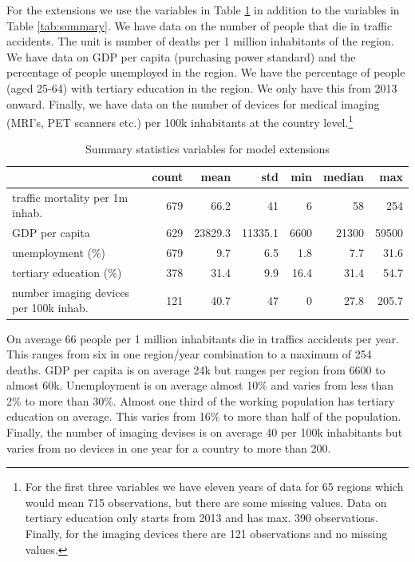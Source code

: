 \documentclass[a4paper,12pt]{article}
\begin{document}
For the extensions we use the variables in Table \ref{tab:summaryExtensions} in addition to the variables in Table \ref{tab:summary}. We have data on the number of people that die in traffic accidents. The unit is number of deaths per 1 million inhabitants of the region. We have data on GDP per capita (purchasing power standard) and the percentage of people unemployed in the region. We have the percentage of people (aged 25-64) with tertiary education in the region. We only have this from 2013 onward. Finally, we have data on the number of devices for medical imaging (MRI's, PET scanners etc.) per 100k inhabitants at the country level.\footnote{For the first three variables we have eleven years of data for 65 regions which would mean 715 observations, but there are some missing values. Data on tertiary education only starts from 2013 and has max. 390 observations. Finally, for the imaging devices there are 121 observations and no missing values.}


\begin{table}[htbp]
\caption{\label{tab:summaryExtensions}Summary statistics variables for model extensions}
\centering
\begin{tabular}{lrrrrrr}
 & count & mean & std & min & median & max\\
\hline
traffic mortality per 1m inhab. & 679 & 66.2 & 41 & 6 & 58 & 254\\
GDP per capita & 629 & 23829.3 & 11335.1 & 6600 & 21300 & 59500\\
unemployment (\%) & 679 & 9.7 & 6.5 & 1.8 & 7.7 & 31.6\\
tertiary education (\%) & 378 & 31.4 & 9.9 & 16.4 & 31.4 & 54.7\\
number imaging devices per 100k inhab. & 121 & 40.7 & 47 & 0 & 27.8 & 205.7\\
\end{tabular}
\end{table}

On average 66 people per 1 million inhabitants die in traffics accidents per year. This ranges from six in one region/year combination to a maximum of 254 deaths. GDP per capita is on average 24k but ranges per region from 6600 to almost 60k. Unemployment is on average almost 10\% and varies from less than 2\% to more than 30\%. Almost one third of the working population has tertiary education on average. This varies from 16\% to more than half of the population. Finally, the number of imaging devises is on average 40 per 100k inhabitants but varies from no devices in one year for a country to more than 200.
\end{document}
